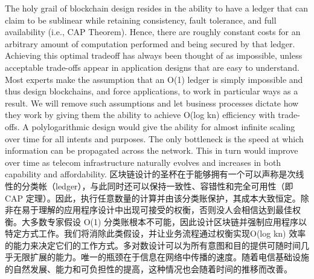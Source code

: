 \documentclass{ctexart}
\begin{document}
The holy grail of blockchain design resides in the ability to have a ledger that can claim to be sublinear while retaining consistency, fault tolerance, and full availability (i.e., CAP Theorem). Hence, there are roughly constant costs for an arbitrary amount of computation performed and being secured by that ledger. Achieving this optimal tradeoff has always been thought of as impossible, unless acceptable trade-offs appear in application designs that are easy to understand. Most experts make the assumption that an O(1) ledger is simply impossible and thus design blockchains, and force applications, to work in particular ways as a result. We will remove such assumptions and let business processes dictate how they work by giving them the ability to achieve O(log kn) efficiency with trade-offs. A polylogarithmic design would give the ability for almost infinite scaling over time for all intents and purposes. The only bottleneck is the speed at which information can be propagated across the network. This in turn would improve over time as telecom infrastructure naturally evolves and increases in both capability and affordability. 区块链设计的圣杯在于能够拥有一个可以声称是次线性的分类帐（ledger），与此同时还可以保持一致性、容错性和完全可用性（即 CAP 定理）。因此，执行任意数量的计算并由该分类账保护，其成本大致恒定。除非在易于理解的应用程序设计中出现可接受的权衡，否则没人会相信达到最佳权衡。大多数专家假设 O(1) 分类账根本不可能，因此设计区块链并强制应用程序以特定方式工作。我们将消除此类假设，并让业务流程通过权衡实现O(log kn) 效率的能力来决定它们的工作方式。多对数设计可以为所有意图和目的提供可随时间几乎无限扩展的能力。唯一的瓶颈在于信息在网络中传播的速度。随着电信基础设施的自然发展、能力和可负担性的提高，这种情况也会随着时间的推移而改善。
\end{document}
